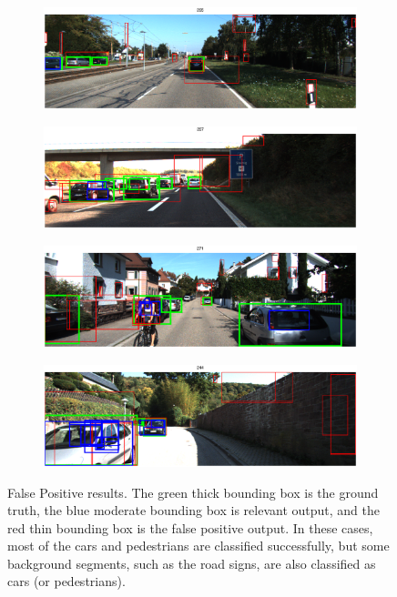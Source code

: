 \documentclass{article} %
\begin{document}
\begin{figure}[htb]
\begin{subfigure}[b]{0.5\textwidth}
    \includegraphics[width=.9\textwidth]{test-fp1.eps}
    \label{fig:test-fp1}
\end{subfigure}
\begin{subfigure}[b]{0.5\textwidth}
    \includegraphics[width=.9\textwidth]{test-fp2.eps}
    \label{fig:test-fp2}
\end{subfigure}

\begin{subfigure}[b]{0.5\textwidth}
    \includegraphics[width=.9\textwidth]{test-fp3.eps}
    \label{fig:test-fp3}
\end{subfigure}
\begin{subfigure}[b]{0.5\textwidth}
    \includegraphics[width=.9\textwidth]{test-fp4.eps}
    \label{fig:test-fp4}
\end{subfigure}
\caption{False Positive results. The green thick bounding box is the ground truth, the blue moderate bounding box is relevant output, and the red thin bounding box is the false positive output. In these cases, most of the cars and pedestrians are classified successfully, but some background segments, such as the road signs, are also classified as cars (or pedestrians).
\label{fig:test-fp}}
\end{figure}
\end{document}
